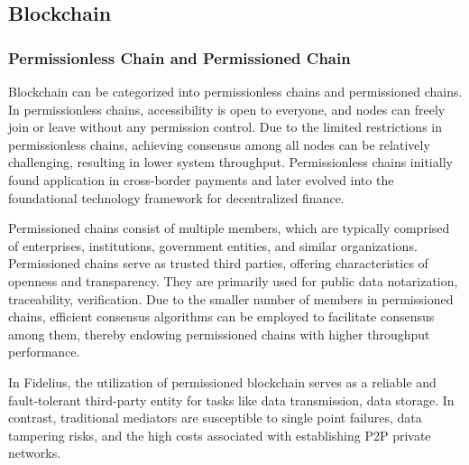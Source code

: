 
\subsection{Blockchain}
\subsubsection{Permissionless Chain and Permissioned Chain}
Blockchain can be categorized into permissionless chains and permissioned chains. In permissionless chains, accessibility is open to everyone, and nodes can freely join or leave without any permission control. Due to the limited restrictions in permissionless chains, achieving consensus among all nodes can be relatively challenging, resulting in lower system throughput. Permissionless chains initially found application in cross-border payments and later evolved into the foundational technology framework for decentralized finance.

Permissioned chains consist of multiple members, which are typically comprised of enterprises, institutions, government entities, and similar organizations. Permissioned chains serve as trusted third parties, offering characteristics of openness and transparency. They are primarily used for public data notarization, traceability, verification. Due to the smaller number of members in permissioned chains, efficient consensus algorithms can be employed to facilitate consensus among them, thereby endowing permissioned chains with higher throughput performance.

In Fidelius, the utilization of permissioned blockchain serves as a reliable and fault-tolerant third-party entity for tasks like data transmission, data storage. In contrast, traditional mediators are susceptible to single point failures, data tampering risks, and the high costs associated with establishing P2P private networks.

